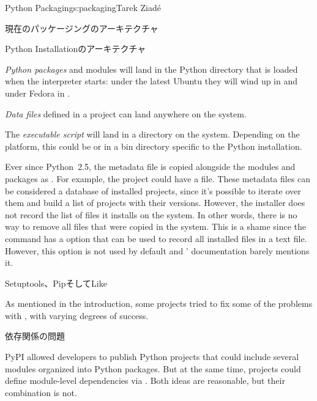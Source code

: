 \begin{aosachapter}{Python Packaging}{s:packaging}{Tarek Ziad\'{e}}
\begin{aosasect1}{現在のパッケージングのアーキテクチャ}
\begin{aosasect2}{Python Installationのアーキテクチャ}
\begin{aosaitemize}
  \item \emph{Python packages} and modules will land in the Python
  directory that is loaded when the interpreter starts: under the
  latest Ubuntu they will wind up in
   and under Fedora in
  .

  \item \emph{Data files} defined in a project can land anywhere
  on the system.

  \item The \emph{executable script} will land in a  directory
  on the system. Depending on the platform, this could be
   or in a bin directory specific to the Python
  installation.

\end{aosaitemize}

Ever since Python~2.5, the metadata file is copied alongside the modules
and packages as . For example, the
 project could have a
 file.  These metadata files can be
considered a database of installed projects, since it's possible to
iterate over them and build a list of projects with their versions.
However, the  installer does not record the list of
files it installs on the system.  In other words, there is no way to
remove all files that were copied in the system.  This is a shame
since the  command has a  option that can
be used to record all installed files in a text file. However, this
option is not used by default and ' documentation
barely mentions it.

\end{aosasect2}

\begin{aosasect2}{Setuptools、PipそしてLike}

As mentioned in the introduction, some projects tried to fix some of
the problems with , with varying degrees of success.

\begin{aosasect3}{依存関係の問題}

PyPI allowed developers to publish Python projects that could include
several modules organized into Python packages. But at the same time,
projects could define module-level dependencies via .
Both ideas are reasonable, but their combination is not.


\end{aosasect3}
\end{aosasect2}
\end{aosasect1}
\end{aosachapter}
